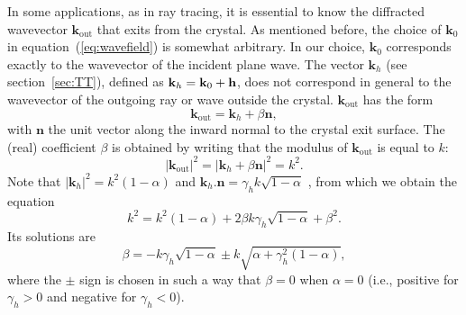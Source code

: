 \documentclass{iucr}
\begin{document}
In some applications, as in ray tracing, it is essential to know the diffracted wavevector $\textbf{k}_{\text{out}}$ that exits from the crystal. As mentioned before, the choice of $\textbf{k}_0$ in equation~(\ref{eq:wavefield}) is somewhat arbitrary.
In our choice, $\textbf{k}_0$ corresponds exactly to the wavevector of the incident plane wave.
The vector $\textbf{k}_h$ (see section~\ref{sec:TT}), defined  as $\textbf k_h=\textbf k_0 + \textbf h$, does not correspond in general to the wavevector of the outgoing ray or wave outside the crystal. $\textbf{k}_\text{out}$ has the form 
\begin{equation}
    \textbf{k}_{\text{out}} = \textbf{k}_h + \beta \textbf{n}, \nonumber
\end{equation}
with $\textbf{n}$ the unit vector along the inward normal to the crystal exit surface. The (real) coefficient $\beta$ is obtained by writing that the modulus of $\textbf{k}_{\text{out}}$ is equal to $k$:
\begin{equation}
    |\textbf{k}_{\text{out}}|^2 = |\textbf{k}_h + \beta \textbf{n}|^2=k^2. \nonumber
\end{equation}
Note that $|\textbf{k}_h|^2=k^2(1-\alpha)$ and $\textbf{k}_h . \textbf{n} = \gamma_h k \sqrt{1-\alpha}$ , from which we obtain the equation
\begin{equation}
    k^2 = k^2 (1-\alpha) + 
    2 \beta k \gamma_h \sqrt{1-\alpha}
    + \beta^2. \nonumber
\end{equation}
Its solutions are
\begin{equation}
    \beta = - k \gamma_h \sqrt{1-\alpha} \pm k \sqrt{\alpha + \gamma_h^2 (1-\alpha)}, \nonumber
\end{equation}
where the $\pm$ sign is chosen in such a way that $\beta=0$ when $\alpha=0$ (i.e., positive for $\gamma_h>0$ and negative for  $\gamma_h<0$).

\end{document}
